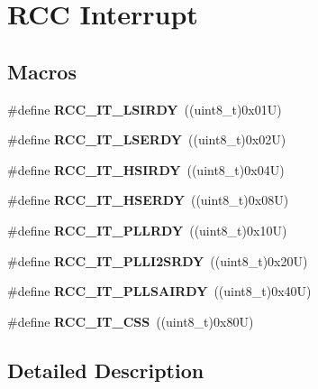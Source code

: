 \hypertarget{group___r_c_c___interrupt}{}\section{R\+CC Interrupt}
\label{group___r_c_c___interrupt}
\subsection*{Macros}
\begin{DoxyCompactItemize}
\item 
\mbox{\label{group___r_c_c___interrupt_ga2b4ef277c1b71f96e0bef4b9a72fca94}} 
\#define {\bfseries R\+C\+C\+\_\+\+I\+T\+\_\+\+L\+S\+I\+R\+DY}~((uint8\+\_\+t)0x01\+U)
\item 
\mbox{\label{group___r_c_c___interrupt_gad6b6e78a426850f595ef180d292a673d}} 
\#define {\bfseries R\+C\+C\+\_\+\+I\+T\+\_\+\+L\+S\+E\+R\+DY}~((uint8\+\_\+t)0x02\+U)
\item 
\mbox{\label{group___r_c_c___interrupt_ga69637e51b71f73f519c8c0a0613d042f}} 
\#define {\bfseries R\+C\+C\+\_\+\+I\+T\+\_\+\+H\+S\+I\+R\+DY}~((uint8\+\_\+t)0x04\+U)
\item 
\mbox{\label{group___r_c_c___interrupt_gad13eaede352bca59611e6cae68665866}} 
\#define {\bfseries R\+C\+C\+\_\+\+I\+T\+\_\+\+H\+S\+E\+R\+DY}~((uint8\+\_\+t)0x08\+U)
\item 
\mbox{\label{group___r_c_c___interrupt_ga68d48e7811fb58f2649dce6cf0d823d9}} 
\#define {\bfseries R\+C\+C\+\_\+\+I\+T\+\_\+\+P\+L\+L\+R\+DY}~((uint8\+\_\+t)0x10\+U)
\item 
\mbox{\label{group___r_c_c___interrupt_ga6468ff3bad854272cf1120ffbf69b7ac}} 
\#define {\bfseries R\+C\+C\+\_\+\+I\+T\+\_\+\+P\+L\+L\+I2\+S\+R\+DY}~((uint8\+\_\+t)0x20\+U)
\item 
\mbox{\label{group___r_c_c___interrupt_ga4f9e4c71ae81585c30cf0a87bc1d8cca}} 
\#define {\bfseries R\+C\+C\+\_\+\+I\+T\+\_\+\+P\+L\+L\+S\+A\+I\+R\+DY}~((uint8\+\_\+t)0x40\+U)
\item 
\mbox{\label{group___r_c_c___interrupt_ga9bb34a4912d2084dc1c0834eb53aa7a3}} 
\#define {\bfseries R\+C\+C\+\_\+\+I\+T\+\_\+\+C\+SS}~((uint8\+\_\+t)0x80\+U)
\end{DoxyCompactItemize}


\subsection{Detailed Description}
